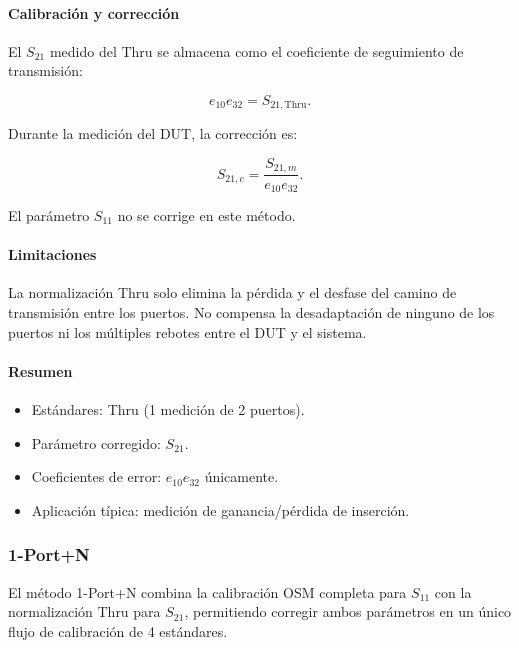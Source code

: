 \paragraph{Calibración y corrección}

El $S_{21}$ medido del Thru se almacena como el coeficiente de seguimiento de
transmisión:

\begin{equation}
    e_{10}e_{32} = S_{21,\text{Thru}}.
\end{equation}

Durante la medición del DUT, la corrección es:

\begin{equation}
    S_{21,c} = \frac{S_{21,m}}{e_{10}e_{32}}.
    \label{eq:thru_norm}
\end{equation}

El parámetro $S_{11}$ no se corrige en este método.

\paragraph{Limitaciones}

La normalización Thru solo elimina la pérdida y el desfase del camino de
transmisión entre los puertos. No compensa la desadaptación de ninguno de los
puertos ni los múltiples rebotes entre el DUT y el sistema.

\paragraph{Resumen}

\begin{itemize}
    \item Estándares: Thru (1 medición de 2 puertos).
    \item Parámetro corregido: $S_{21}$.
    \item Coeficientes de error: $e_{10}e_{32}$ únicamente.
    \item Aplicación típica: medición de ganancia/pérdida de inserción.
\end{itemize}

\subsubsection{1-Port+N}
\label{sec:1portn}

El método 1-Port+N combina la calibración OSM completa para $S_{11}$ con la
normalización Thru para $S_{21}$, permitiendo corregir ambos parámetros en
un único flujo de calibración de 4 estándares.


